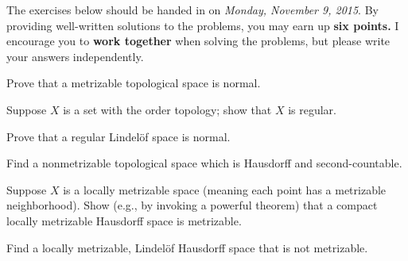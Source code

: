 \documentclass[12pt]{pset}
\author{Jim Fowler}
\date{Autumn 2015}
\begin{document}
\maketitle

\noindent The exercises below should be handed in on \textit{Monday,
  November 9, 2015}.  By providing well-written solutions to the
problems, you may earn up \textbf{six points.}  I encourage you to
\textbf{work together} when solving the problems, but please write
your answers independently.

\begin{problem}

  Prove that a metrizable topological space is normal.

\end{problem}

\begin{problem}

  Suppose $X$ is a set with the order topology; show that $X$ is regular.

\end{problem}

\begin{problem}

  Prove that a regular Lindel\"of space is normal.

\end{problem}

\clearpage

\begin{problem}

  Find a nonmetrizable topological space which is Hausdorff and
  second-countable.

\end{problem}

\begin{problem}

  Suppose $X$ is a locally metrizable space (meaning each point has a
  metrizable neighborhood).  Show (e.g., by invoking a powerful
  theorem) that a compact locally metrizable Hausdorff space is
  metrizable.

\end{problem}

\begin{problem}

  Find a locally metrizable, Lindel\"of Hausdorff space that is not metrizable.


\end{problem}
\end{document}
